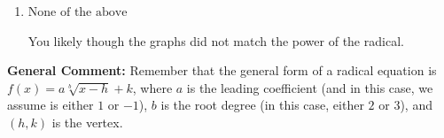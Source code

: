 \documentclass{extbook}[14pt]
\begin{document}
\begin{enumerate}
{\begin{enumerate}[label=\Alph*.]
This corresponds to switching the coefficient and having the correct vertex with the root degree as $3$.
\item \( \text{None of the above} \)

You likely though the graphs did not match the power of the radical.
\end{enumerate}

\textbf{General Comment:} Remember that the general form of a radical equation is $ f(x) = a \sqrt[b]{x - h} + k$, where $a$ is the leading coefficient (and in this case, we assume is either $1$ or $-1$), $b$ is the root degree (in this case, either $2$ or $3$), and $(h, k)$ is the vertex.
}
\end{enumerate}
\end{document}
